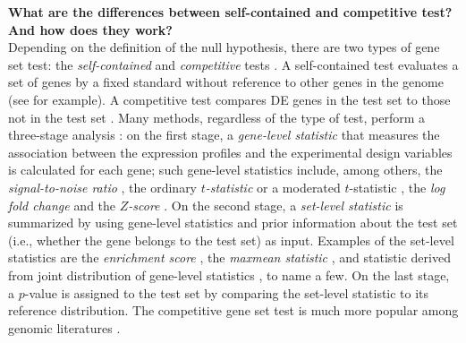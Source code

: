 \documentclass[11pt, a4paper]{article}
\begin{document}
	 	\textbf{What are the differences between self-contained and competitive test? And how does they work?}\\
	 Depending on the definition of the null hypothesis, there are two types of gene set test: the \textit{self-contained} and \textit{competitive} tests \citep{goeman2007analyzing}. A self-contained test evaluates a set of genes by a fixed standard without reference to other genes in the genome (see \cite{goeman2004global,goeman2005testing, tsai2009multivariate, wu2010roast, huang2013gene} for example). A competitive test compares DE
	 genes in the test set to those not in the test set \citep{tian2005discovering, wu2012camera, yaari2013quantitative}. Many methods, regardless of the type of test, perform a three-stage analysis \citep{khatri2012ten}: on the first stage, a \textit{gene-level statistic} that measures the association between the expression profiles and the experimental design variables is calculated for each gene; such gene-level statistics include, among others, the \textit{signal-to-noise ratio} \citep{subramanian2005gene}, the ordinary \textit{$t$-statistic} \citep{tian2005discovering} or a moderated $t$-statistic \citep{Smyth2004moderated}, the \textit{log fold change} \citep{kim2005page} and the \textit{$Z$-score} \citep{efron2007correlation}. On the second stage, a \textit{set-level statistic} is summarized by using gene-level statistics and prior information about the test set (i.e., whether the gene belongs to the test set) as input. Examples of the set-level statistics are the \textit{enrichment score} \citep{subramanian2005gene}, the \textit{maxmean statistic} \citep{efron2007testing}, and statistic derived from joint distribution of gene-level statistics \citep{yaari2013quantitative}, to name a few. On the last stage, a $p$-value is assigned to the test set by comparing the set-level statistic to its reference distribution. The competitive gene set test is much more popular among genomic literatures \citep{goeman2007analyzing, gatti2010heading}.  
	 
	
\end{document}
